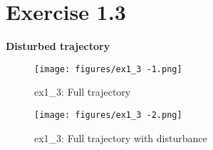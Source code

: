 \section*{Exercise 1.3}

\textbf{Disturbed trajectory}

\begin{figure*}[htbp]
    \centering
    \texttt{[image: figures/ex1\_3 -1.png]}
    \caption{ex1\_3: Full trajectory}
\end{figure*}

\begin{figure*}[htbp]
    \centering
    \texttt{[image: figures/ex1\_3 -2.png]}
    \caption{ex1\_3: Full trajectory with disturbance}
\end{figure*}
